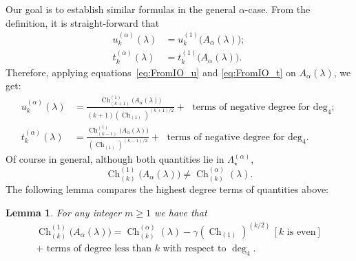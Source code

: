 \documentclass[11pt]{amsart}
\theoremstyle{plain}
\newtheorem{lemma}{Lemma}[section]
\theoremstyle{remark}
\newcommand{\Pola}{\Lambda_\star^{(\alpha)}}
\DeclareMathOperator{\Ch}{Ch}
\begin{document}
Our goal is to establish similar formulas in the general $\alpha$-case.
From the definition, it is straight-forward that
\begin{align}                                   
    u_{k}^{(\alpha)}(\lambda) &= u_{k}^{(1)}\big(A_\alpha(\lambda) \big); \\
    t_{k}^{(\alpha)}(\lambda) &= t_{k}^{(1)}\big(A_\alpha(\lambda) \big).
\end{align}
Therefore, applying equations~\eqref{eq:FromIO_u} and \eqref{eq:FromIO_t} on $A_\alpha(\lambda)$,
we get:
\begin{align}
    u_{k}^{(\alpha)}(\lambda) &= \frac{\Ch^{(1)}_{(k+1)}\big(A_\alpha(\lambda) \big)}{(k+1) \left(\Ch_{(1)}\right)^{(k+1)/2}} 
    +\text{ terms of negative degree for $\deg_4$;}
    \label{eq:FromIO_u_la^al}\\
    t_{k}^{(\alpha)}(\lambda) &= \frac{\Ch^{(1)}_{(k-1)}\big(A_\alpha(\lambda) \big)}{\left(\Ch_{(1)}\right)^{(k-1)/2}}
    +\text{ terms of negative degree for $\deg_4$.}
    \label{eq:FromIO_t_la^al}
\end{align}
Of course in general, although both quantities lie in $\Pola$,
\[\Ch^{(1)}_{(k)}\big(A_\alpha(\lambda) \big) \neq \Ch^{(\alpha)}_{(k)}(\lambda).\]
The following lemma compares the highest degree terms of quantities above:
\begin{lemma}
\label{lem:1toAlpha}
For any integer $m \geq 1$ we have that
\begin{multline} 
\Ch^{(1)}_{(k)}\big(A_\alpha(\lambda)\big) 
= \Ch^{(\alpha)}_{(k)}(\lambda) - \gamma\left(\Ch_{(1)}\right)^{(k/2)} \, [k\text{ is even}] \\
+ \text{ terms of degree less than }
    k\text{ with respect to }\deg_4.
\end{multline}
\end{lemma}
\end{document}
